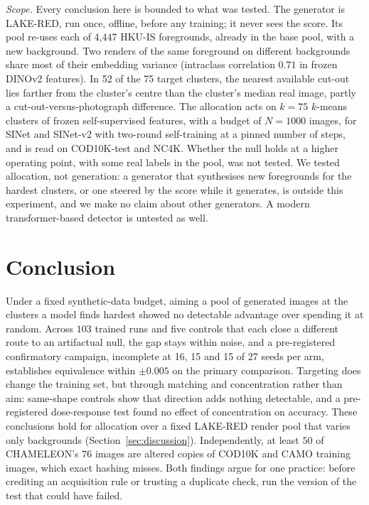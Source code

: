 \documentclass{article}
\newif\ifrevmarked \revmarkedtrue
\DeclareRobustCommand{\revB}[1]{\ifrevmarked{\color{RevB}#1}\else{#1}\fi}
\DeclareRobustCommand{\revC}[1]{\ifrevmarked{\color{RevC}#1}\else{#1}\fi}
\DeclareRobustCommand{\revShared}[1]{\ifrevmarked{\color{RevShared}#1}\else{#1}\fi}
\begin{document}
\revShared{\textit{Scope.} Every conclusion here is bounded to what was tested. The generator is LAKE-RED, run once, offline,
before any training; it never sees the score. Its pool re-uses each of 4,447 HKU-IS foregrounds, already in the base pool, with a new background. Two renders of
the same foreground on different backgrounds share most of their embedding variance (intraclass correlation $0.71$ in
frozen DINOv2 features). In 52 of the 75 target clusters, the nearest available cut-out lies farther from the cluster's
centre than the cluster's median real image, partly a cut-out-versus-photograph difference. The allocation acts on $k = 75$ $k$-means clusters of frozen self-supervised features,
with a budget of $N = 1000$ images, for SINet and SINet-v2 with two-round self-training at a pinned number of
steps, and is read on COD10K-test and NC4K. Whether the null holds at a higher operating point, with some real labels in the pool, was not tested. We tested allocation, not generation: a generator that synthesises new
foregrounds for the hardest clusters, or one steered by the score while it generates, is outside this experiment, and
we make no claim about other generators.} \revB{A modern transformer-based detector is untested as well.}


\section{Conclusion}
\label{sec:conclusion}
Under a fixed synthetic-data budget, aiming \revShared{a pool of generated images} at the clusters a model finds hardest \revShared{showed no detectable advantage over} spending it at random. Across $103$ trained runs and five controls that each close a different
route to an artifactual null, the gap stays within noise\revShared{, and a pre-registered confirmatory campaign, incomplete at
16, 15 and 15 of 27 seeds per arm, establishes equivalence within $\pm0.005$ on the primary comparison}. Targeting does change the training set,
but through \revB{matching and} concentration rather than aim\revShared{: same-shape controls show that direction adds nothing
detectable, and a pre-registered dose-response test found no effect of concentration on accuracy. These conclusions hold
for allocation over a fixed LAKE-RED render pool that varies only backgrounds (Section~\ref{sec:discussion})}. Independently,
\revC{at least} $50$ of CHAMELEON's $76$ images are altered copies of COD10K and CAMO training images, which exact
hashing misses. Both findings argue for one practice: before crediting an acquisition rule or
trusting a duplicate check, run the version of the test that could have failed.
\end{document}
